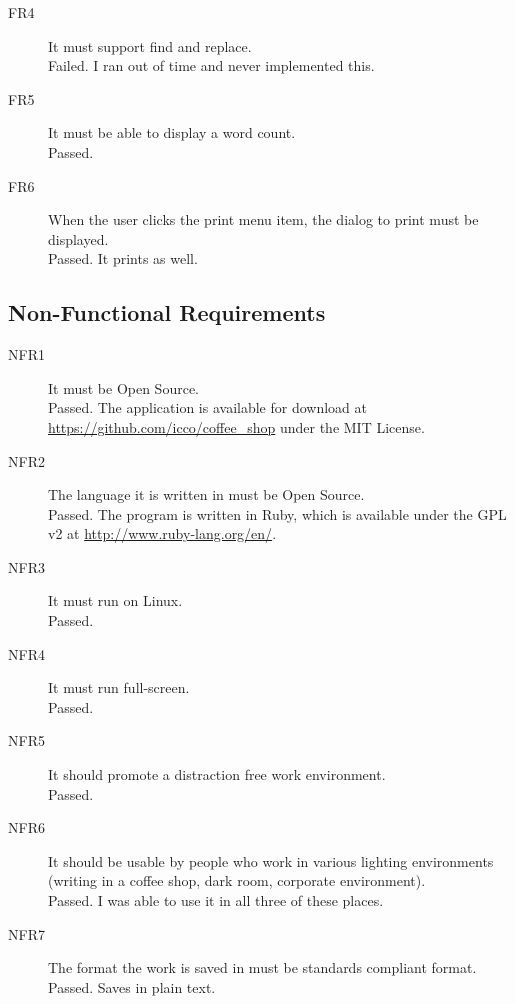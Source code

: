 \documentclass[10pt]{article}
\begin{document}
\begin{description}
\begin{description}
   \end{description}

   \item[FR4] It must support find and replace. \\ Failed. I ran out of time and never implemented this.

   \item[FR5] It must be able to display a word count. \\ Passed.

   \item[FR6] When the user clicks the print menu item, the dialog to print must be displayed. \\ Passed. It prints as well.
 
\end{description}

\subsection{Non-Functional Requirements}

\begin{description}

   \item[NFR1] It must be Open Source. \\ Passed. The application is available for download at \url{https://github.com/icco/coffee_shop} under the MIT License.

   \item[NFR2] The language it is written in must be Open Source. \\ Passed. The program is written in Ruby, which is available under the GPL v2 at \url{http://www.ruby-lang.org/en/}.

   \item[NFR3] It must run on Linux. \\ Passed.

   \item[NFR4] It must run full-screen. \\ Passed.

   \item[NFR5] It should promote a distraction free work environment. \\ Passed.

   \item[NFR6] It should be usable by people who work in various lighting environments (writing in a coffee shop, dark room, corporate environment). \\ Passed. I was able to use it in all three of these places.

   \item[NFR7] The format the work is saved in must be standards compliant format. \\ Passed. Saves in plain text.

\end{description}
\end{document}
